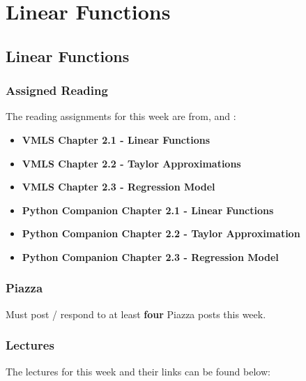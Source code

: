 \clearpage

\renewcommand{\ChapTitle}{Linear Functions}
\renewcommand{\SectionTitle}{Linear Functions}

\chapter{\ChapTitle}
\section{\SectionTitle}

\subsection{Assigned Reading}

The reading assignments for this week are from, \VMLS \hspace*{1pt} and \PyCap:

\begin{itemize}
    \item \textbf{VMLS Chapter 2.1 - Linear Functions}
    \item \textbf{VMLS Chapter 2.2 - Taylor Approximations}
    \item \textbf{VMLS Chapter 2.3 - Regression Model}
    \item \textbf{Python Companion Chapter 2.1 - Linear Functions}
    \item \textbf{Python Companion Chapter 2.2 - Taylor Approximation}
    \item \textbf{Python Companion Chapter 2.3 - Regression Model}
\end{itemize}

\subsection{Piazza}

Must post / respond to at least \textbf{four} Piazza posts this week.

\subsection{Lectures}

The lectures for this week and their links can be found below:

